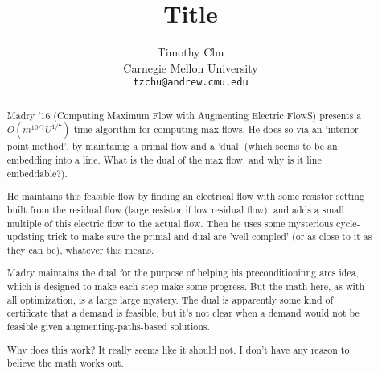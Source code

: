 


\title{Title}
\author{
  Timothy Chu \\
  Carnegie Mellon University\\
  \texttt{tzchu@andrew.cmu.edu}
}

\setcounter{page}{0}
\maketitle
\thispagestyle{empty}
\begin{abstract}
Madry '16 (Computing Maximum Flow with Augmenting Electric FlowS)
presents a $O(m^{10/7}U^{1/7})$ time algorithm for computing max
flows. He does so via an `interior point method', by maintainig a
primal flow and a 'dual' (which seems to be an embedding into a line.
What is the dual of the max flow, and why is it line embeddable?). 

He maintains this feasible flow by finding an electrical flow with
some resistor setting built from the residual flow (large resistor if
low residual flow), and adds a small multiple of this electric flow to
the actual flow. Then he uses some mysterious cycle-updating trick to
make sure the primal and dual are 'well compled' (or as close to it as
they can be), whatever this means.

Madry maintains the dual for the purpose of helping his
preconditioninng arcs idea, which
is designed to make each step make some progress. But the
math here, as with all optimization, is a large large mystery. The
dual is apparently some kind of certificate that a demand is feasible,
but it's not clear when a demand would not be feasible given
augmenting-paths-based solutions.

Why does this work? It really seems like it should not. I don't have
any reason to believe the math works out.
\end{abstract}

\clearpage


\begin{appendix}
\end{appendix}

